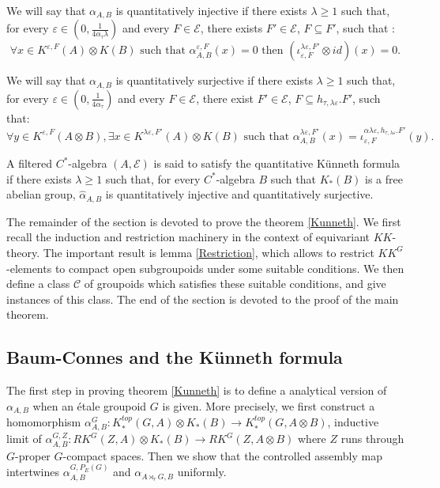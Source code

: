 We will say that $\alpha_{A,B}$ is quantitatively injective if there exists $\lambda \geq 1$ such that, for every $\varepsilon\in (0,\frac{1}{4\alpha_\tau \lambda})$ and every $F\in\mathcal E$, there exists $F'\in\mathcal E$, $F\subseteq F'$, such that : 
\[\forall x\in K^{\varepsilon,F}(A)\otimes K(B)\text{ such that }\alpha_{A,B}^{\varepsilon,F}(x)=0 \text{ then }(\iota_{\varepsilon,F}^{\lambda\varepsilon,F'}\otimes id) (x) = 0.\] 

We will say that $\alpha_{A,B}$ is quantitatively surjective if there exists $\lambda \geq 1$ such that, for every $\varepsilon \in (0,\frac{1}{4\alpha_\tau})$ and every $F\in\mathcal E$, there exist $F'\in\mathcal E$, $F\subseteq h_{\tau,\lambda\varepsilon}.F'$, such that:
\[ \forall y\in K^{\varepsilon,F}(A\otimes B), \exists x\in K^{\lambda\varepsilon, F'}(A)\otimes K(B) \text{ such that }
\alpha^{\lambda\varepsilon,F'}_{A,B}(x)=\iota_{\varepsilon,F}^{\alpha\lambda\varepsilon,h_{\tau, \lambda\varepsilon}.F'}(y).\] 


\begin{definition}
A filtered $C^*$-algebra $(A,\mathcal E)$ is said to satisfy the quantitative Künneth formula if there exists $\lambda \geq 1$ such that, for every $C^*$-algebra $B$ such that $K_*(B)$ is a free abelian group, $\hat\alpha_{A,B}$ is quantitatively injective and quantitatively surjective. 
\end{definition}

The remainder of the section is devoted to prove the theorem \ref{Kunneth}. We first recall the induction and restriction machinery in the context of equivariant $KK$-theory. The important result is lemma \ref{Restriction}, which allows to restrict $KK^G$-elements to compact open subgroupoids under some suitable conditions. We then define a class $\mathcal C$ of groupoids which satisfies these suitable conditions, and give instances of this class. The end of the section is devoted to the proof of the main theorem.



\subsection{Baum-Connes and the Künneth formula}
The first step in proving theorem \ref{Kunneth} is to define a analytical version of $\alpha_{A,B}$ when an étale groupoid $G$ is given. More precisely, we first construct a homomorphism $\alpha_{A,B}^G : K_*^{top}(G,A)\otimes K_*(B)\rightarrow K_*^{top}(G,A\otimes B )$, inductive limit of $\alpha_{A,B}^{G,Z} : RK^G(Z,A)\otimes K_*(B)\rightarrow RK^G(Z,A\otimes B )$ where $Z$ runs through $G$-proper $G$-compact spaces. Then we show that the controlled assembly map intertwines $\alpha^{G,P_E(G)}_{A,B}$ and $\alpha_{A\rtimes_r G,B}$ uniformly.\\

